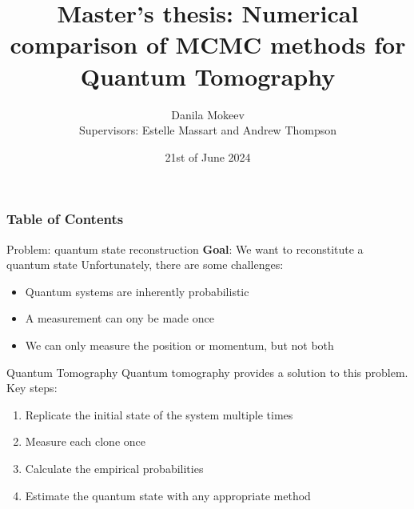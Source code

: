 \documentclass{beamer}
\title{Master's thesis: Numerical comparison of MCMC methods for Quantum Tomography}
\author[Mokeev]
{ Danila Mokeev\\{\small Supervisors: Estelle Massart and Andrew Thompson}}
\institute[EPL]{Ecole Polytechnique de Louvain}
\date{21st of June 2024}
\newcommand{\tb}{\textbf}
\begin{document}
\frame{\titlepage}

\begin{frame}
\frametitle{Table of Contents}
\tableofcontents
\end{frame}


\begin{frame}{Problem: quantum state reconstruction}
    \tb{Goal}: We want to reconstitute a quantum state\medbreak
    Unfortunately, there are some challenges: 
    \begin{itemize}
        \item Quantum systems are inherently probabilistic
        \item A measurement can ony be made once
        \item We can only measure the position or momentum, but not both
    \end{itemize}
\end{frame}
\begin{frame}{Quantum Tomography}
    Quantum tomography provides a solution to this problem.\medbreak
    Key steps:
    \begin{enumerate}
        \item Replicate the initial state of the system multiple times
        \item Measure each clone once
        \item Calculate the empirical probabilities
        \item Estimate the quantum state with any appropriate method
    \end{enumerate}

\end{frame}
\end{document}
